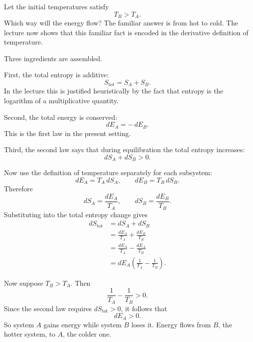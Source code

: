 Let the initial temperatures satisfy
\begin{equation}
T_B > T_A.
\end{equation}
Which way will the energy flow? The familiar answer is from hot to cold. The lecture now shows that this familiar fact is encoded in the derivative definition of temperature.

Three ingredients are assembled.

First, the total entropy is additive:
\begin{equation}
S_{\mathrm{tot}} = S_A + S_B.
\end{equation}
In the lecture this is justified heuristically by the fact that entropy is the logarithm of a multiplicative quantity.

Second, the total energy is conserved:
\begin{equation}
dE_A = -\,dE_B.
\end{equation}
This is the first law in the present setting.

Third, the second law says that during equilibration the total entropy increases:
\begin{equation}
dS_A + dS_B > 0.
\end{equation}

Now use the definition of temperature separately for each subsystem:
\begin{equation}
dE_A = T_A\, dS_A,
\qquad
dE_B = T_B\, dS_B.
\end{equation}
Therefore
\begin{equation}
dS_A = \frac{dE_A}{T_A},
\qquad
dS_B = \frac{dE_B}{T_B}.
\end{equation}
Substituting into the total entropy change gives
\begin{align}
dS_{\mathrm{tot}}
&= dS_A + dS_B \\
&= \frac{dE_A}{T_A} + \frac{dE_B}{T_B} \\
&= \frac{dE_A}{T_A} - \frac{dE_A}{T_B} \\
&= dE_A\left(\frac{1}{T_A} - \frac{1}{T_B}\right).
\end{align}

Now suppose \(T_B > T_A\). Then
\begin{equation}
\frac{1}{T_A} - \frac{1}{T_B} > 0.
\end{equation}
Since the second law requires \(dS_{\mathrm{tot}} > 0\), it follows that
\begin{equation}
dE_A > 0.
\end{equation}
So system \(A\) gains energy while system \(B\) loses it. Energy flows from \(B\), the hotter system, to \(A\), the colder one.

